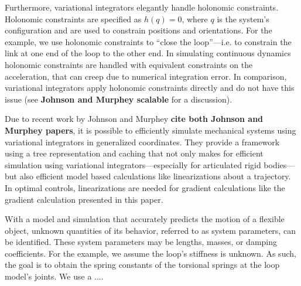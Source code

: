 \documentclass[letterpaper, 10pt, conference]{ieeeconf}
\begin{document}
Furthermore, variational integrators elegantly handle holonomic constraints.  Holonomic constraints are specified as $h(q) = 0$, where $q$ is the system's configuration and are used to constrain positions and orientations.  For the example, we use holonomic constraints to ``close the loop''---i.e. to constrain the link at one end of the loop to the other end.  In simulating continuous dynamics holonomic constraints are handled with equivalent constraints on the acceleration, that can creep due to numerical integration error.  In comparison, variational integrators apply holonomic constraints directly and do not have this issue (see \textbf{Johnson and Murphey scalable} for a discussion).

Due to recent work by Johnson and Murphey \textbf{cite both Johnson and Murphey papers}, it is possible to efficiently simulate mechanical systems using variational integrators in generalized coordinates. They provide a framework using a tree representation and caching that not only makes for efficient simulation using variational integrators---especially for articulated rigid bodies---but also efficient model based calculations like linearizations about a trajectory.   In optimal controls, linearizations are needed for gradient calculations like the gradient calculation presented in this paper.  %

With a model and simulation that accurately predicts the motion of a flexible object, unknown quantities of its behavior, referred to as system parameters, can be identified.  These system parameters may be lengths, masses, or damping coefficients.  For the example, we assume the loop's stiffness is unknown.  As such, the goal is to obtain the spring constants of the torsional springs at the loop model's joints.  We use a ....




\end{document}
